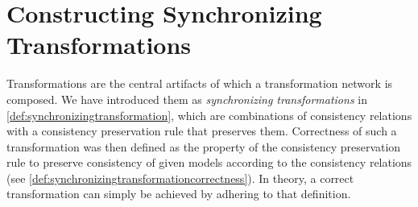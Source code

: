 \chapter{Constructing Synchronizing Transformations
}
\label{chap:synchronization}




Transformations are the central artifacts of which a transformation network is composed.
We have introduced them as \emph{synchronizing transformations} in \autoref{def:synchronizingtransformation}, which are combinations of consistency relations with a consistency preservation rule that preserves them.
Correctness of such a transformation was then defined as the property of the consistency preservation rule to preserve consistency of given models according to the consistency relations (see \autoref{def:synchronizingtransformationcorrectness}).
In theory, a correct transformation can simply be achieved by adhering to that definition.



